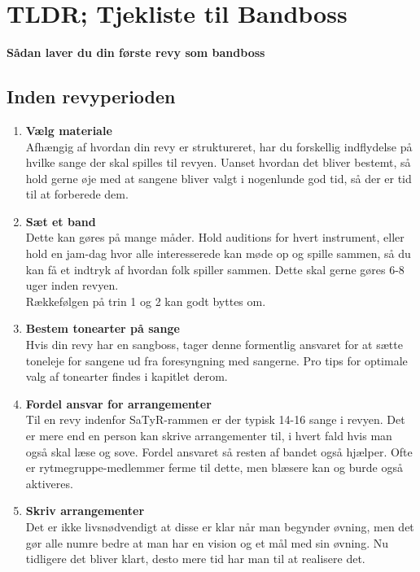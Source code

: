 \section*{TLDR; Tjekliste til Bandboss}

\textbf{Sådan laver du din første revy som bandboss}

\subsection*{Inden revyperioden}

\begin{enumerate}
\item \textbf{Vælg materiale}\\
Afhængig af hvordan din revy er struktureret, har du forskellig indflydelse på hvilke sange der skal spilles til revyen. Uanset hvordan det bliver bestemt, så hold gerne øje med at sangene bliver valgt i nogenlunde god tid, så der er tid til at forberede dem.

\item \textbf{Sæt et band}\\
Dette kan gøres på mange måder. Hold auditions for hvert instrument, eller hold en jam-dag hvor alle interesserede kan møde op og spille sammen, så du kan få et indtryk af hvordan folk spiller sammen. Dette skal gerne gøres 6-8 uger inden revyen.\\
Rækkefølgen på trin 1 og 2 kan godt byttes om.

\item \textbf{Bestem tonearter på sange}\\
Hvis din revy har en sangboss, tager denne formentlig ansvaret for at sætte toneleje for sangene ud fra foresyngning med sangerne. Pro tips for optimale valg af tonearter findes i kapitlet derom.

\item \textbf{Fordel ansvar for arrangementer}\\
Til en revy indenfor SaTyR-rammen er der typisk 14-16 sange i revyen. Det er mere end en person kan skrive arrangementer til, i hvert fald hvis man også skal læse og sove. Fordel ansvaret så resten af bandet også hjælper. Ofte er rytmegruppe-medlemmer ferme til dette, men blæsere kan og burde også aktiveres.

\item \textbf{Skriv arrangementer}\\
Det er ikke livsnødvendigt at disse er klar når man begynder øvning, men det gør alle numre bedre at man har en vision og et mål med sin øvning. Nu tidligere det bliver klart, desto mere tid har man til at realisere det.


\end{enumerate}
